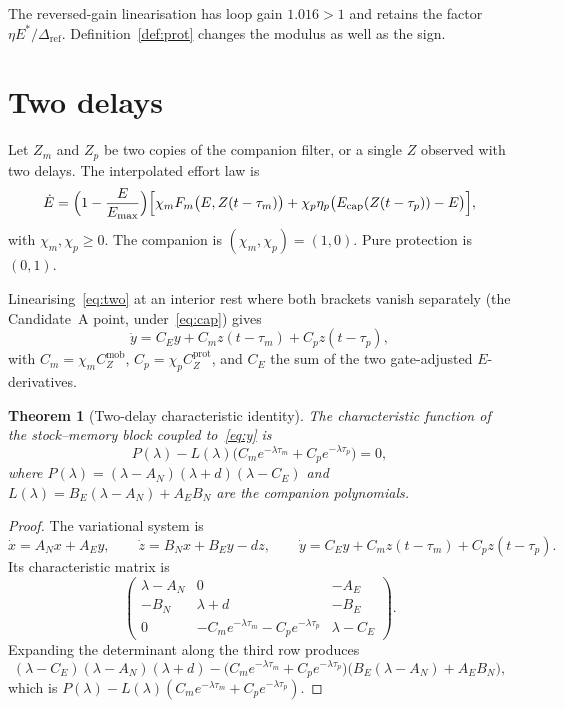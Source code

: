 \documentclass[11pt]{article}
\newtheorem{theorem}{Theorem}
\theoremstyle{definition}
\begin{document}
The reversed-gain linearisation has loop gain $1.016>1$ and retains the factor $\eta E^*/\Delta_{\mathrm{ref}}$. Definition~\ref{def:prot} changes the modulus as well as the sign.

\section{Two delays}

Let $Z_m$ and $Z_p$ be two copies of the companion filter, or a single $Z$ observed with two delays. The interpolated effort law is
\begin{equation}
\dot E=\Bigl(1-\frac{E}{E_{\max}}\Bigr)
\Bigl[\chi_m F_m\bigl(E,Z(t-\tau_m)\bigr)+\chi_p\eta_p\bigl(E_{\mathrm{cap}}(Z(t-\tau_p))-E\bigr)\Bigr],
\label{eq:two}
\end{equation}
with $\chi_m,\chi_p\ge 0$. The companion is $(\chi_m,\chi_p)=(1,0)$. Pure protection is $(0,1)$.

Linearising~\eqref{eq:two} at an interior rest where both brackets vanish separately (the Candidate~A point, under~\eqref{eq:cap}) gives
\begin{equation}
\dot y=C_E y+C_m z(t-\tau_m)+C_p z(t-\tau_p),
\label{eq:y}
\end{equation}
with $C_m=\chi_m C_Z^{\mathrm{mob}}$, $C_p=\chi_p C_Z^{\mathrm{prot}}$, and $C_E$ the sum of the two gate-adjusted $E$-derivatives.

\begin{theorem}[Two-delay characteristic identity]
\label{thm:char}
The characteristic function of the stock--memory block coupled to~\eqref{eq:y} is
\begin{equation}
P(\lambda)-L(\lambda)\bigl(C_m e^{-\lambda\tau_m}+C_p e^{-\lambda\tau_p}\bigr)=0,
\label{eq:qp}
\end{equation}
where $P(\lambda)=(\lambda-A_N)(\lambda+d)(\lambda-C_E)$ and $L(\lambda)=B_E(\lambda-A_N)+A_E B_N$ are the companion polynomials.
\end{theorem}

\begin{proof}
The variational system is
\[
\dot x=A_N x+A_E y,\qquad
\dot z=B_N x+B_E y-d z,\qquad
\dot y=C_E y+C_m z(t-\tau_m)+C_p z(t-\tau_p).
\]
Its characteristic matrix is
\[
\begin{pmatrix}
\lambda-A_N&0&-A_E\\
-B_N&\lambda+d&-B_E\\
0&-C_m e^{-\lambda\tau_m}-C_p e^{-\lambda\tau_p}&\lambda-C_E
\end{pmatrix}.
\]
Expanding the determinant along the third row produces
\[
(\lambda-C_E)(\lambda-A_N)(\lambda+d)
-\bigl(C_m e^{-\lambda\tau_m}+C_p e^{-\lambda\tau_p}\bigr)\bigl(B_E(\lambda-A_N)+A_E B_N\bigr),
\]
which is $P(\lambda)-L(\lambda)(C_m e^{-\lambda\tau_m}+C_p e^{-\lambda\tau_p})$.
\end{proof}
\end{document}
